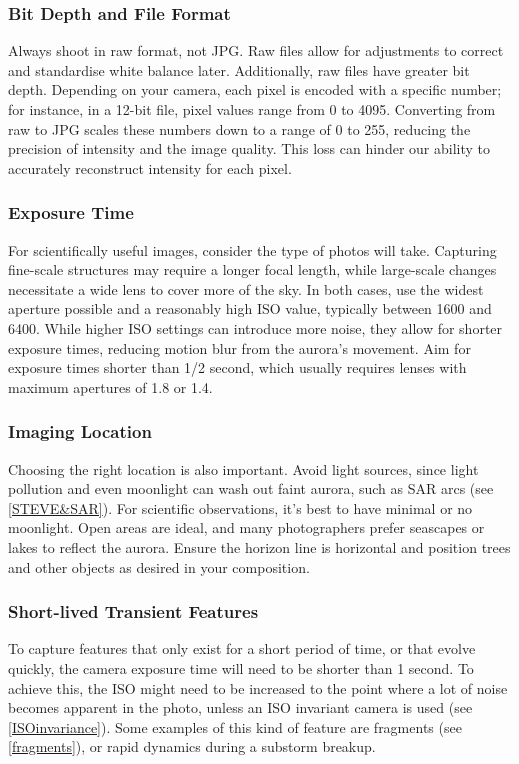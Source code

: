 \documentclass{article}
\begin{document}
\subsubsection{Bit Depth and File Format}
Always shoot in raw format, not JPG. Raw files allow for adjustments to correct and standardise white balance later. Additionally, raw files have greater bit depth. Depending on your camera, each pixel is encoded with a specific number; for instance, in a 12-bit file, pixel values range from 0 to 4095. Converting from raw to JPG scales these numbers down to a range of 0 to 255, reducing the precision of intensity and the image quality. This loss can hinder our ability to accurately reconstruct intensity for each pixel.

\subsubsection{Exposure Time}
For scientifically useful images, consider the type of photos will take. Capturing fine-scale structures may require a longer focal length, while large-scale changes necessitate a wide lens to cover more of the sky. In both cases, use the widest aperture possible and a reasonably high ISO value, typically between 1600 and 6400. While higher ISO settings can introduce more noise, they allow for shorter exposure times, reducing motion blur from the aurora's movement. Aim for exposure times shorter than 1/2 second, which usually requires lenses with maximum apertures of 1.8 or 1.4.

\subsubsection{Imaging Location}
Choosing the right location is also important. Avoid light sources, since light pollution and even moonlight can wash out faint aurora, such as SAR arcs (see \ref{STEVE&SAR}). For scientific observations, it’s best to have minimal or no moonlight. Open areas are ideal, and many photographers prefer seascapes or lakes to reflect the aurora. Ensure the horizon line is horizontal and position trees and other objects as desired in your composition.

\subsubsection{Short-lived Transient Features}\label{sec:Short-timescale}
To capture features that only exist for a short period of time, or that evolve quickly, the camera exposure time will need to be shorter than 1 second. To achieve this, the ISO might need to be increased to the point where a lot of noise becomes apparent in the photo, unless an ISO invariant camera is used (see \ref{ISOinvariance}). Some examples of this kind of feature are fragments (see \ref{fragments}), or rapid dynamics during a substorm breakup.
\end{document}
